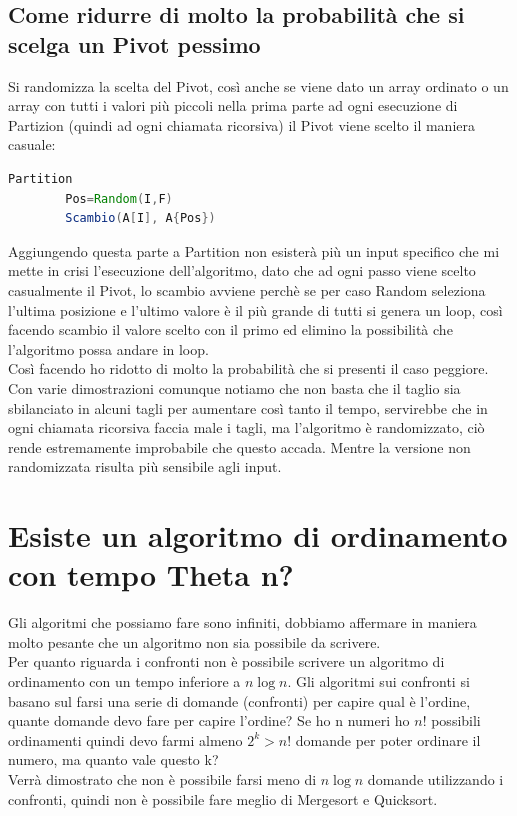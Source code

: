 \subsection{Come ridurre di molto la probabilità che si scelga un Pivot pessimo}
Si randomizza la scelta del Pivot, così anche se viene dato un array ordinato o un array
con tutti i valori più piccoli nella prima parte ad ogni esecuzione di Partizion (quindi
ad ogni chiamata ricorsiva) il Pivot viene scelto il maniera casuale:
\begin{lstlisting}[language=Java]
    Partition
        Pos=Random(I,F)
        Scambio(A[I], A{Pos})
\end{lstlisting}
Aggiungendo questa parte a Partition non esisterà più un input specifico che mi mette
in crisi l'esecuzione dell'algoritmo, dato che ad ogni passo viene scelto casualmente
il Pivot, lo scambio avviene perchè se per caso Random seleziona l'ultima posizione e l'ultimo
valore è il più grande di tutti si genera un loop, così facendo scambio il valore scelto con il
primo ed elimino la possibilità che l'algoritmo possa andare in loop.\\
Così facendo ho ridotto di molto la probabilità che si presenti il caso peggiore.\\
Con varie dimostrazioni comunque notiamo che non basta che il taglio sia sbilanciato in
alcuni tagli per aumentare così tanto il tempo, servirebbe che in ogni chiamata ricorsiva
faccia male i tagli, ma l'algoritmo è randomizzato, ciò rende estremamente improbabile che
questo accada. Mentre la versione non randomizzata risulta più sensibile agli input.\\

\section{Esiste un algoritmo di ordinamento con tempo Theta n?}
Gli algoritmi che possiamo fare sono infiniti, dobbiamo affermare in maniera molto
pesante che un algoritmo non sia possibile da scrivere.\\
Per quanto riguarda i confronti non è possibile scrivere un algoritmo di ordinamento
con un tempo inferiore a $n \log n$. Gli algoritmi sui confronti si basano sul farsi una serie
di domande (confronti) per capire qual è l'ordine, quante domande devo fare per capire 
l'ordine? Se ho n numeri ho $n!$ possibili ordinamenti quindi devo farmi almeno 
$2^k > n!$ domande per poter ordinare il numero, ma quanto vale questo k?\\
Verrà dimostrato che non è possibile farsi meno di $n \log n$ domande utilizzando
i confronti, quindi non è possibile fare meglio di Mergesort e Quicksort.
